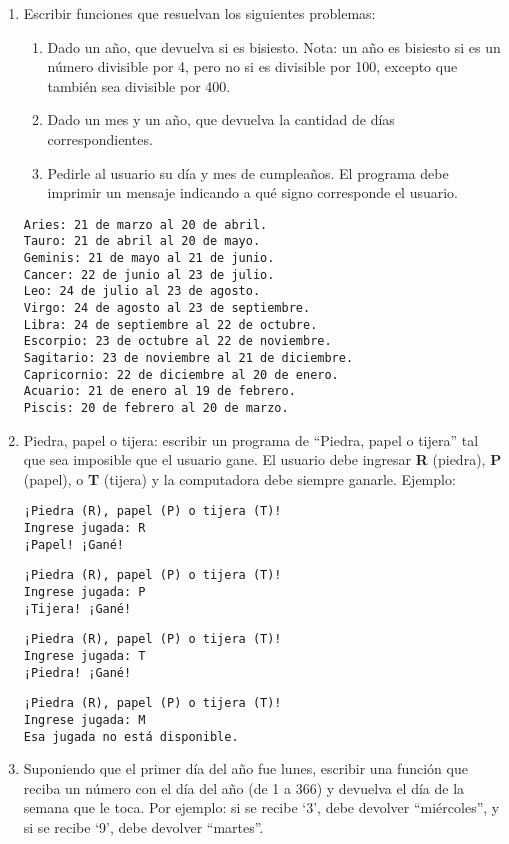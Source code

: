 \documentclass[
  letterpaper,
  DIV=11,
  numbers=noendperiod]{scrreprt}
\providecommand{\tightlist}{%
  \setlength{\itemsep}{0pt}\setlength{\parskip}{0pt}}\usepackage{longtable,booktabs,array}
\begin{document}
\begin{enumerate}
\def\labelenumi{\arabic{enumi}.}
\setcounter{enumi}{4}
\item
  Escribir funciones que resuelvan los siguientes problemas:

  \begin{enumerate}
  \def\labelenumii{\alph{enumii}.}
  \tightlist
  \item
    Dado un año, que devuelva si es bisiesto. Nota: un año es bisiesto
    si es un número divisible por 4, pero no si es divisible por 100,
    excepto que también sea divisible por 400.
  \item
    Dado un mes y un año, que devuelva la cantidad de días
    correspondientes.
  \item
    Pedirle al usuario su día y mes de cumpleaños. El programa debe
    imprimir un mensaje indicando a qué signo corresponde el usuario.
  \end{enumerate}

\begin{verbatim}
Aries: 21 de marzo al 20 de abril.
Tauro: 21 de abril al 20 de mayo.
Geminis: 21 de mayo al 21 de junio.
Cancer: 22 de junio al 23 de julio.
Leo: 24 de julio al 23 de agosto.
Virgo: 24 de agosto al 23 de septiembre.
Libra: 24 de septiembre al 22 de octubre.
Escorpio: 23 de octubre al 22 de noviembre.
Sagitario: 23 de noviembre al 21 de diciembre.
Capricornio: 22 de diciembre al 20 de enero.
Acuario: 21 de enero al 19 de febrero.
Piscis: 20 de febrero al 20 de marzo.
\end{verbatim}
\item
  Piedra, papel o tijera: escribir un programa de ``Piedra, papel o
  tijera'' tal que sea imposible que el usuario gane. El usuario debe
  ingresar \textbf{R} (piedra), \textbf{P} (papel), o \textbf{T}
  (tijera) y la computadora debe siempre ganarle. Ejemplo:

\begin{verbatim}
¡Piedra (R), papel (P) o tijera (T)!
Ingrese jugada: R
¡Papel! ¡Gané!
\end{verbatim}

\begin{verbatim}
¡Piedra (R), papel (P) o tijera (T)!
Ingrese jugada: P
¡Tijera! ¡Gané!
\end{verbatim}

\begin{verbatim}
¡Piedra (R), papel (P) o tijera (T)!
Ingrese jugada: T
¡Piedra! ¡Gané!
\end{verbatim}

\begin{verbatim}
¡Piedra (R), papel (P) o tijera (T)!
Ingrese jugada: M
Esa jugada no está disponible.
\end{verbatim}
\item
  Suponiendo que el primer día del año fue lunes, escribir una función
  que reciba un número con el día del año (de 1 a 366) y devuelva el día
  de la semana que le toca. Por ejemplo: si se recibe `3', debe devolver
  ``miércoles'', y si se recibe `9', debe devolver ``martes''.
\end{enumerate}
\end{document}
